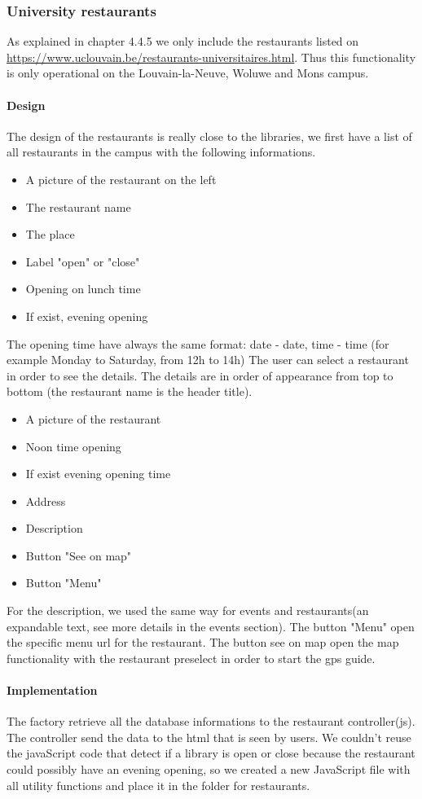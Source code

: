 \documentclass{eplmastersthesis}
\begin{document}
\subsubsection{University restaurants}
As explained in chapter 4.4.5 we only include the restaurants listed on \url{https://www.uclouvain.be/restaurants-universitaires.html}. Thus this functionality is only operational on the Louvain-la-Neuve, Woluwe and Mons campus.
\paragraph{Design}
The design of the restaurants is really close to the libraries, we first have a list of all restaurants in the campus with the following informations.
\begin{itemize}
\item A picture of the restaurant on the left
\item The restaurant name
\item The place
\item Label "open" or "close"
\item Opening on lunch time
\item If exist, evening opening
\end{itemize}
The opening time have always the same format: date - date, time - time (for example Monday to Saturday, from 12h to 14h)
The user can select a restaurant in order to see the details. The details are in order of appearance from top to bottom (the restaurant name is the header title). 
\begin{itemize}
\item A picture of the restaurant
\item Noon time opening 
\item If exist evening opening time 
\item Address
\item Description
\item Button "See on map"
\item Button "Menu"
\end{itemize}
For the description, we used the same way for events and restaurants(an expandable text, see more details in the events section). The button "Menu" open the specific menu url for the restaurant. The button see on map open the map functionality with the restaurant preselect in order to start the gps guide.
\paragraph{Implementation}
The factory retrieve all the database informations to the restaurant controller(js). The controller send the data to the html that is seen by users. We couldn't reuse the javaScript code that detect if a library is open or close because the restaurant could possibly have an evening opening, so we created a new JavaScript file with all utility functions and place it in the folder for restaurants. 
\end{document}
